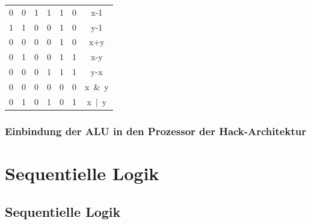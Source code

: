 \documentclass[12pt]{report}
\begin{document}
\begin{table}[H]
\begin{tabular}{|C|C|C|C|C|C|C|}
    0                                                & 0                                               & 1                          & 1                          & 1                                          & 0          & x-1      \\
    1                                                & 1                                               & 0                          & 0                          & 1                                          & 0          & y-1      \\
    0                                                & 0                                               & 0                          & 0                          & 1                                          & 0          & x+y      \\
    0                                                & 1                                               & 0                          & 0                          & 1                                          & 1          & x-y      \\
    0                                                & 0                                               & 0                          & 1                          & 1                                          & 1          & y-x      \\
    0                                                & 0                                               & 0                          & 0                          & 0                                          & 0          & x\ \&\ y \\
    0                                                & 1                                               & 0                          & 1                          & 0                                          & 1          & x\ |\ y  \\ \hline
  \end{tabular}
\end{table}
\subsection{Einbindung der ALU in den Prozessor der Hack-Architektur}


\chapter{Sequentielle Logik}
\section{Sequentielle Logik}
\end{document}
